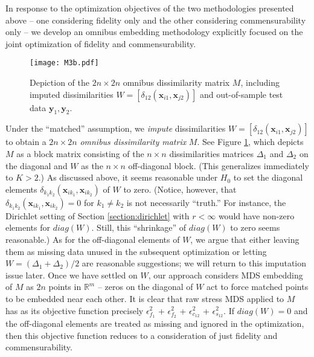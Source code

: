 \documentclass[12pt,xcolor]{article}
\newcommand{\1}{\ensuremath{\mbox{{\bf 1}}}}
\begin{document}
In response to the optimization objectives of the two methodologies presented above --
one considering fidelity only and the other considering commensurability only --
we develop an omnibus embedding methodology explicitly focused on the joint optimization of fidelity and commensurability.

\begin{figure}[h]
  \begin{center}
    \texttt{[image: M3b.pdf]}
    \caption{Depiction of the $2n \times 2n$ omnibus dissimilarity matrix $M$, including imputed dissimilarities
    $W=[\delta_{12}(\bm{x}_{i1},\bm{x}_{j2})]$ and out-of-sample test data $\bm{y}_{1}, \bm{y}_{2}$.}\label{fig:M}
  \end{center}
  \end{figure}

Under the ``matched'' assumption, we {\em impute} dissimilarities $W = [\delta_{12}(\bm{x}_{i1},\bm{x}_{j2})]$
to obtain a $2n \times 2n$ {\em omnibus dissimilarity matrix} $M$. See Figure \ref{fig:M},
which depicts $M$ as a block matrix consisting of the $n \times n$ dissimilarities matrices $\Delta_1$ and $\Delta_2$ on
the diagonal and $W$ as the $n \times n$ off-diagonal block.
(This generalizes immediately to $K>2$.)
As discussed above,
it seems reasonable under $H_0$ to set the diagonal elements $\delta_{k_1k_2}(\bm{x}_{ik_1},\bm{x}_{ik_2})$ of $W$ to zero.
(Notice, however, that
$\delta_{k_1k_2}(\bm{x}_{ik_1},\bm{x}_{ik_2})=0$ for $k_1 \neq k_2$
is not necessarily ``truth.'' For instance, the Dirichlet setting of Section \ref{section:dirichlet} with $r < \infty$
would have non-zero elements for $diag(W)$. Still, this ``shrinkage'' of $diag(W)$ to zero seems reasonable.)
As for the off-diagonal elements of $W$, we argue that either leaving them as missing data
unused in the subsequent optimization or letting $W=(\Delta_1 + \Delta_2)/2$ are reasonable suggestions;
we will return to this imputation issue later.
Once we have settled on $W$, our approach considers MDS embedding of $M$ as $2n$ points in $\mathbb{R}^{m}$ --
zeros on the diagonal of $W$ act to force matched points to be embedded near each other.
It is clear that raw stress MDS applied to $M$ has as its objective function precisely
$\epsilon^2_{f_{1}}$ + $\epsilon^2_{f_{2}}$ + $\epsilon^2_{c_{12}}$ + $\epsilon^2_{s_{12}}$.
If $diag(W)=0$ and the off-diagonal elements are treated as missing and ignored in the optimization,
then this objective function reduces to a consideration of just fidelity and commensurability.
\end{document}

